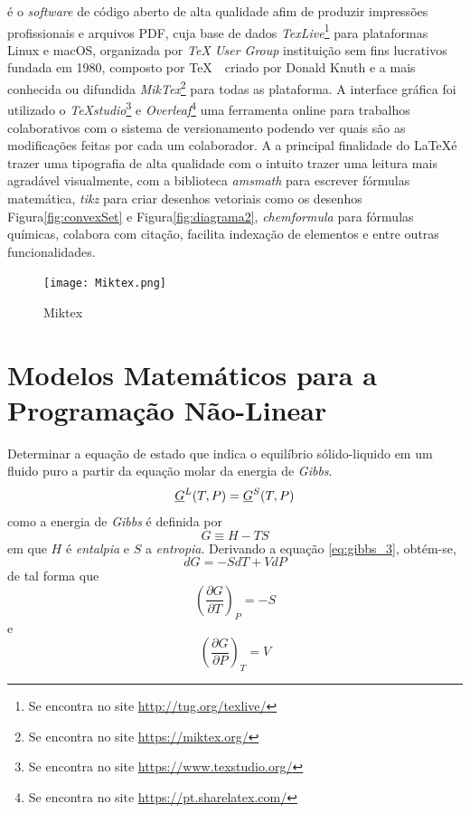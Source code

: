 \LaTeXe  é o \textit{software} de código aberto de alta qualidade afim de produzir impressões profissionais e arquivos PDF, cuja base de dados \textit{TexLive}\footnote{Se encontra no site \url{http://tug.org/texlive/}} para plataformas Linux e macOS, organizada por \textit{TeX User Group} instituição sem fins lucrativos fundada em 1980, composto por \TeX\ \ criado por Donald Knuth e a mais conhecida ou difundida \textit{MikTex}\footnote{Se encontra no site \url{https://miktex.org/}} para todas as plataforma. A interface gráfica foi utilizado o \textit{TeXstudio}\footnote{Se encontra no site \url{https://www.texstudio.org/}} e \textit{Overleaf}\footnote{Se encontra no site \url{https://pt.sharelatex.com/}} uma ferramenta online para trabalhos colaborativos com o sistema de versionamento podendo ver quais são as modificações feitas por cada um colaborador. A a principal finalidade do \LaTeX é trazer uma tipografia de alta qualidade com o intuito trazer uma leitura mais agradável visualmente, com a biblioteca \textit{amsmath} para escrever fórmulas matemática, \textit{tikz} para criar desenhos vetoriais como os desenhos Figura\ref{fig:convexSet} e Figura\ref{fig:diagrama2}, \textit{chemformula} para fórmulas químicas, colabora com citação, facilita indexação de elementos e entre outras funcionalidades. \cite{latexchemformula,latexabntex2,latextikz,tex}

\begin{figure}[H]
	\centering
	\texttt{[image: Miktex.png]}
	\caption[Miktex]{Miktex}
	\label{fig:Miktex}
\end{figure}

\section{Modelos Matemáticos para a Programação Não-Linear}\label{subsection:1}

\hspace{5mm}Determinar a equação de estado que indica o equilíbrio sólido-liquido em um fluido puro a partir da equação molar da energia de \textit{Gibbs}.
\begin{equation}\label{eq:gibbs_2}
\underline{G}^{L}(T,P)=\underline{G}^{S}(T,P)
\end{equation}
como a energia de \textit{Gibbs} é definida por
\begin{equation}\label{eq:gibbs_3}
G\equiv H-TS
\end{equation}
em que $H$ é \textit{entalpia} e $S$ a \textit{entropia}. Derivando a equação \ref{eq:gibbs_3}, obtém-se,
\begin{equation}\label{eq:gibbs_4}
dG=-SdT+VdP
\end{equation}
de tal forma que
\begin{equation}\label{eq:gibbs_5}
\left(\dfrac{\partial G}{\partial T}\right)_{P}=-S
\end{equation}
e 
\begin{equation}\label{eq:gibbs_6}
\left(\dfrac{\partial G}{\partial P}\right)_{T}=V
\end{equation}


